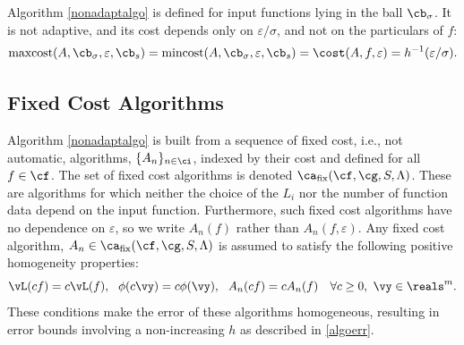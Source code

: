 \documentclass[]{elsarticle}
\DeclareMathOperator{\fix}{fix}
\DeclareMathOperator{\maxcost}{maxcost}
\DeclareMathOperator{\mincost}{mincost}
\theoremstyle{definition}
\theoremstyle{remark}
\begin{document}
Algorithm \ref{nonadaptalgo} is defined for input functions lying in the ball $\cb_{\sigma}$.  It is not adaptive, and its cost depends only on $\varepsilon/\sigma$, and not on the particulars of $f$:
\begin{equation} \label{nonadaptalgocost}
\maxcost(A,\cb_{\sigma},\varepsilon,\cb_{s}) = \mincost(A,\cb_{\sigma},\varepsilon,\cb_{s}) = \cost(A,f,\varepsilon) = h^{-1}(\varepsilon/\sigma).
\end{equation}

\subsection{Fixed Cost Algorithms}

Algorithm \ref{nonadaptalgo} is built from a sequence of fixed cost, i.e., not automatic, algorithms, $\{A_n\}_{n \in \ci}$, indexed by their cost and defined for all $f \in \cf$.  The set of fixed cost algorithms is denoted $\ca_{\fix}(\cf,\cg,S,\Lambda)$.  These are algorithms for which neither the choice of the $L_i$ nor the number of function data depend on the input function.  Furthermore, such fixed cost algorithms have no dependence on $\varepsilon$, so we write $A_n(f)$ rather than $A_n(f,\varepsilon)$.  Any fixed cost algorithm, $A_n \in \ca_{\fix}(\cf,\cg,S,\Lambda)$ is assumed to satisfy the following positive homogeneity properties:
\begin{equation*}
\label{algoscale}
\vL(cf) = c \vL(f), \ \
\phi(c\vy) = c\phi(\vy), \ \ A_n(cf) = cA_n(f) \quad \forall c \ge 0, \ \vy \in \reals^m.
\end{equation*}
These conditions make the error of these algorithms homogeneous, resulting in error bounds involving a non-increasing $h$ as described in \eqref{algoerr}.
\end{document}

